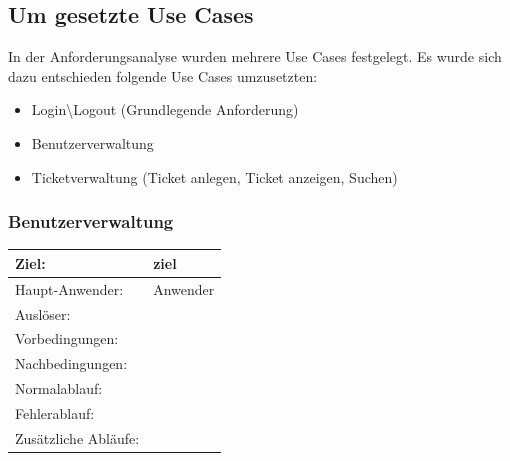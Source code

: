 \documentclass[12pt, a4paper]{article}
\begin{document}
\subsection{Um gesetzte Use Cases}
In der Anforderungsanalyse wurden mehrere Use Cases festgelegt. Es wurde sich dazu entschieden folgende Use Cases umzusetzten:
\begin{itemize}
\item Login\textbackslash Logout (Grundlegende Anforderung)
\item Benutzerverwaltung
\item Ticketverwaltung (Ticket anlegen, Ticket anzeigen, Suchen)
\end{itemize}

\subsubsection{Benutzerverwaltung}
\begin{tabular}{|l|l|}
\hline
  Ziel: & ziel \\
 \hline
  Haupt-Anwender: & Anwender  \\
   \hline
  Auslöser: &  \\
   \hline
  Vorbedingungen: &  \\
   \hline
  Nachbedingungen: &  \\
   \hline
  Normalablauf: &  \\
   \hline
  Fehlerablauf: &  \\
   \hline
  Zusätzliche Abläufe: &  \\
   \hline
 \end{tabular}
\end{document}
